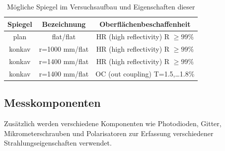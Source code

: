 \begin{table}[H]
  \centering
  \caption{Mögliche Spiegel im Versuchsaufbau und Eigenschaften dieser\cite{anleitung}}
  \begin{tabular}{c | c | c}
    \toprule
    Spiegel & Bezeichnung & Oberflächenbeschaffenheit \\
    \midrule
    plan    & flat/flat            & HR (high reflectivity) R $\geq 99\%$ \\
    konkav  & r=1000 mm/flat       & HR (high reflectivity) R $\geq 99\%$ \\
    konkav  & r=1400 mm/flat       & HR (high reflectivity) R $\geq 99\%$ \\
    konkav  & r=1400 mm/flat       & OC (out coupling) T=1.5,\dots 1.8\% \\
    \bottomrule
  \end{tabular}
  \label{tab:spiegel}
\end{table}

\subsection{Messkomponenten}
Zusätzlich werden verschiedene Komponenten wie Photodioden, Gitter, Mikrometerschrauben und Polarisatoren zur Erfassung verschiedener Strahlungseigenschaften verwendet.
